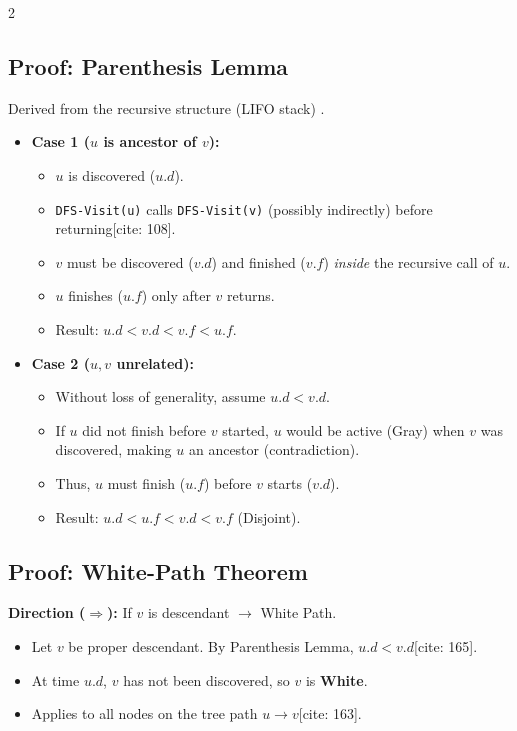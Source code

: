 \documentclass[a4paper,10pt]{article}
\begin{document}
\begin{multicols*}{2}
\subsection*{Proof: Parenthesis Lemma}
Derived from the recursive structure (LIFO stack) .
\begin{itemize}[leftmargin=*]
    \item \textbf{Case 1 ($u$ is ancestor of $v$):}
    \begin{itemize}
        \item $u$ is discovered ($u.d$).
        \item \texttt{DFS-Visit(u)} calls \texttt{DFS-Visit(v)} (possibly indirectly) before returning[cite: 108].
        \item $v$ must be discovered ($v.d$) and finished ($v.f$) \textit{inside} the recursive call of $u$.
        \item $u$ finishes ($u.f$) only after $v$ returns.
        \item Result: $u.d < v.d < v.f < u.f$.
    \end{itemize}
    \item \textbf{Case 2 ($u, v$ unrelated):}
    \begin{itemize}
        \item Without loss of generality, assume $u.d < v.d$.
        \item If $u$ did not finish before $v$ started, $u$ would be active (Gray) when $v$ was discovered, making $u$ an ancestor (contradiction).
        \item Thus, $u$ must finish ($u.f$) before $v$ starts ($v.d$).
        \item Result: $u.d < u.f < v.d < v.f$ (Disjoint).
    \end{itemize}
\end{itemize}

\subsection*{Proof: White-Path Theorem}
\textbf{Direction ($\Rightarrow$):} If $v$ is descendant $\to$ White Path.
\begin{itemize}[leftmargin=*]
    \item Let $v$ be proper descendant. By Parenthesis Lemma, $u.d < v.d$[cite: 165].
    \item At time $u.d$, $v$ has not been discovered, so $v$ is \textbf{White}.
    \item Applies to all nodes on the tree path $u \to v$[cite: 163].
\end{itemize}


\end{multicols*}
\end{document}
